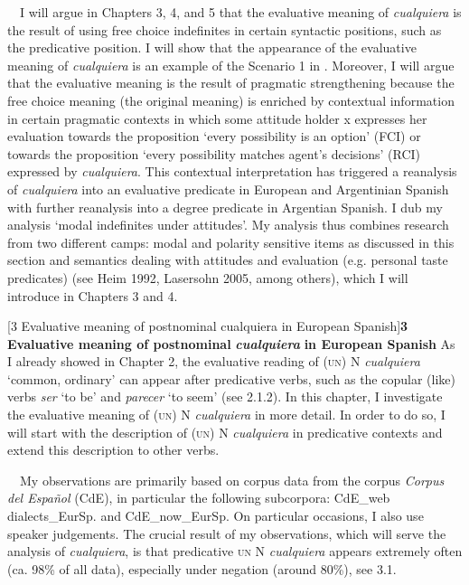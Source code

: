 \documentclass[10pt]{article}
\makeatletter
\renewcommand\section{\@startsection{section}{1}{0.0cm}{0.5in}{0.3335in}{\normalfont\normalsize\fontsize{12pt}{14.4pt}\selectfont\bfseries\raggedright}}
\newenvironment{styleStandard}{\renewcommand\baselinestretch{1.25}\setlength\leftskip{0cm}\setlength\rightskip{0cm}\setlength\parindent{0cm}\setlength\parfillskip{0pt plus 1fil}\setlength\parskip{0in plus 1pt}\writerlistparindent\writerlistleftskip\leavevmode\normalfont\normalsize\fontsize{12pt}{14.4pt}\selectfont\writerlistlabel\ignorespaces}{\unskip\vspace{0in plus 1pt}\par}
\newcommand\writerlistleftskip{}
\newcommand\writerlistparindent{}
\newcommand\writerlistlabel{}
\makeatother
\begin{document}
\begin{styleStandard}
\ \ I will argue in Chapters 3, 4, and 5 that the evaluative meaning of \textit{cualquiera} is the result of using free choice indefinites in certain syntactic positions, such as the predicative position. I will show that the appearance of the evaluative meaning of \textit{cualquiera} is an example of the Scenario 1 in . Moreover, I will argue that the evaluative meaning is the result of pragmatic strengthening because the free choice meaning (the original meaning) is enriched by contextual information in certain pragmatic contexts in which some attitude holder x expresses her evaluation towards the proposition ‘every possibility is an option’ (FCI) or towards the proposition ‘every possibility matches agent’s decisions’ (RCI) expressed by \textit{cualquiera}. This contextual interpretation has triggered a reanalysis of \textit{cualquiera} into an evaluative predicate in European and Argentinian Spanish with further reanalysis into a degree predicate in Argentian Spanish. I dub my analysis ‘modal indefinites under attitudes’. My analysis thus combines research from two different camps: modal and polarity sensitive items as discussed in this section and semantics dealing with attitudes and evaluation (e.g. personal taste predicates) (see Heim 1992, Lasersohn 2005, among others), which I will introduce in Chapters 3 and 4.
\end{styleStandard}

\clearpage\section[3 Evaluative meaning of postnominal cualquiera in European Spanish]{\textbf{3 Evaluative meaning of postnominal }\textbf{\textit{cualquiera }}\textbf{in European Spanish}}
\begin{styleStandard}
As I already showed in Chapter 2, the evaluative reading of (\textsc{un)} N \textit{cualquiera} ‘common, ordinary’ can appear after predicative verbs, such as the copular (like) verbs \textit{ser} ‘to be’ and\textit{ parecer} ‘to seem’ (see 2.1.2). In this chapter, I investigate the evaluative meaning of (\textsc{un)} N\textit{ cualquiera} in more detail. In order to do so, I will start with the description of (\textsc{un)} N \textit{cualquiera} in predicative contexts and extend this description to other verbs.
\end{styleStandard}

\begin{styleStandard}
\ \ My observations are primarily based on corpus data from the corpus \textit{Corpus del Español} (CdE), in particular the following subcorpora: CdE\_web dialects\_EurSp. and CdE\_now\_EurSp. On particular occasions, I also use speaker judgements. The crucial result of my observations, which will serve the analysis of \textit{cualquiera}, is that predicative \textsc{un} N \textit{cualquiera} appears extremely often (ca. 98\% of all data), especially under negation (around 80\%), see 3.1.
\end{styleStandard}
\end{document}
